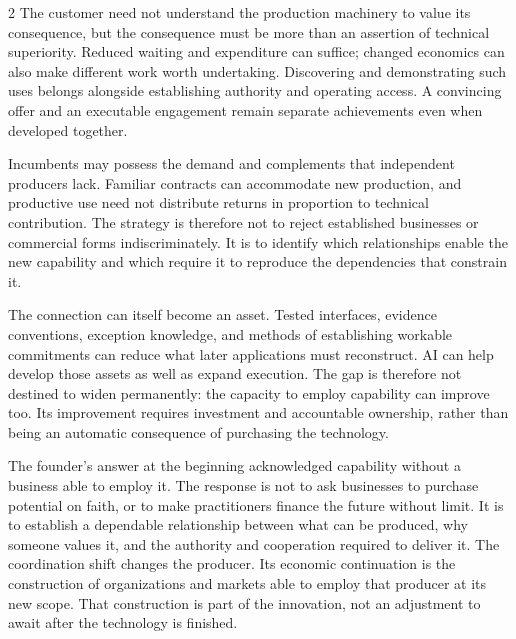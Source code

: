 \begin{multicols}{2}
The customer need not understand the production machinery to value its
consequence, but the consequence must be more than an assertion of
technical superiority. Reduced waiting and expenditure can suffice;
changed economics can also make different work worth undertaking.
Discovering and demonstrating such uses belongs alongside establishing
authority and operating access. A convincing offer and an executable
engagement remain separate achievements even when developed together.

Incumbents may possess the demand and complements that independent
producers lack. Familiar contracts can accommodate new production, and
productive use need not distribute returns in proportion to technical
contribution. The strategy is therefore not to reject established
businesses or commercial forms indiscriminately. It is to identify which
relationships enable the new capability and which require it to
reproduce the dependencies that constrain it.

The connection can itself become an asset. Tested interfaces, evidence
conventions, exception knowledge, and methods of establishing workable
commitments can reduce what later applications must reconstruct. AI can
help develop those assets as well as expand execution. The gap is
therefore not destined to widen permanently: the capacity to employ
capability can improve too. Its improvement requires investment and
accountable ownership, rather than being an automatic consequence of
purchasing the technology.

The founder's answer at the beginning acknowledged capability without a
business able to employ it. The response is not to ask businesses to
purchase potential on faith, or to make practitioners finance the future
without limit. It is to establish a dependable relationship between what
can be produced, why someone values it, and the authority and
cooperation required to deliver it. The coordination shift changes the
producer. Its economic continuation is the construction of organizations
and markets able to employ that producer at its new scope. That
construction is part of the innovation, not an adjustment to await after
the technology is finished.

\end{multicols}
